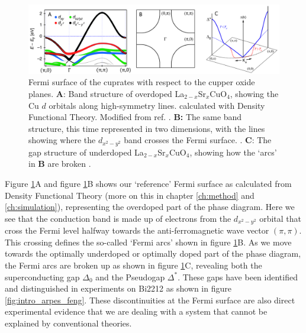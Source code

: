 \begin{figure}
    \centering
    \includegraphics[width=\textwidth]{fig/intro/arpes_fermisurface.png}
    \caption[ARPES fermi surface schematic]{Fermi surface of the cuprates with respect to the cupper oxide planes. \textbf{A}: Band structure of overdoped La$_{2-x}$Sr$_x$CuO$_4$, showing the Cu $d$ orbitals along high-symmetry lines. calculated with Density Functional Theory. Modified from ref. \cite{Matt2018}. \textbf{B:} The same band structure, this time represented in two dimensions, with the lines showing where the $d_{x^2-y^2}$ band crosses the Fermi surface. \cite{Damascelli2003}. \textbf{C}: The gap structure of underdoped La$_{2-x}$Sr$_x$CuO$_4$, showing how the `arcs' in \textbf{B} are broken \cite{Yoshida2011}.}
    \label{fig:intro_arpes}
\end{figure}

Figure \ref{fig:intro_arpes}A and figure \ref{fig:intro_arpes}B shows our `reference' Fermi surface as calculated from Density Functional Theory (more on this in chapter \ref{ch:method} and \ref{ch:simulation}), representing the overdoped part of the phase diagram. Here we see that the conduction band is made up of electrons from the $d_{x^2-y^2}$ orbital that cross the Fermi level halfway towards the anti-ferromagnetic wave vector $(\pi,\pi)$. This crossing defines the so-called `Fermi arcs' shown in figure \ref{fig:intro_arpes}B. As we move towards the optimally underdoped or optimally doped part of the phase diagram, the Fermi arcs are broken up as shown in figure \ref{fig:intro_arpes}C, revealing both the superconducting gap $\Delta_0$ and the Pseudogap $\Delta^*$. These gaps have been identified and distinguished in experiments on Bi2212 as shown in figure \ref{fig:intro_arpes_feng}. These discontinuities at the Fermi surface are also direct experimental evidence that we are dealing with a system that cannot be explained by conventional theories.

